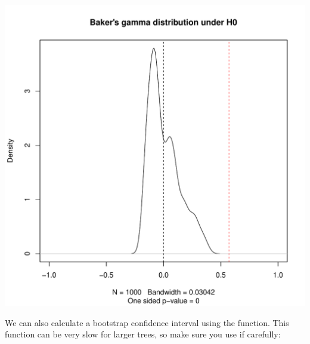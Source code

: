 \documentclass[shortnames,nojss,article]{jss}\usepackage[]{graphicx}\usepackage[]{color}
\makeatletter
\def\maxwidth{ %
  \ifdim\Gin@nat@width>\linewidth
    \linewidth
  \else
    \Gin@nat@width
  \fi
}
\newenvironment{knitrout}{}{} %
\makeatother
\begin{document}
\begin{knitrout}
{\centering \includegraphics[width=\maxwidth]{figure/cor_bakers_gamma_simulation_3} 

}



\end{knitrout}


We can also calculate a bootstrap confidence interval using the  function. This function can be very slow for larger trees, so make sure you use if carefully:
\end{document}

